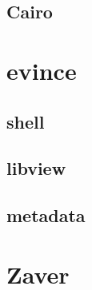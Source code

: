\documentclass[12pt,oneside,final]{fithesis2}
\begin{document}
\section{Cairo}
\chapter{evince}
\section{shell}
\section{libview}
\section{metadata}
\chapter{Zaver}


\end{document}
